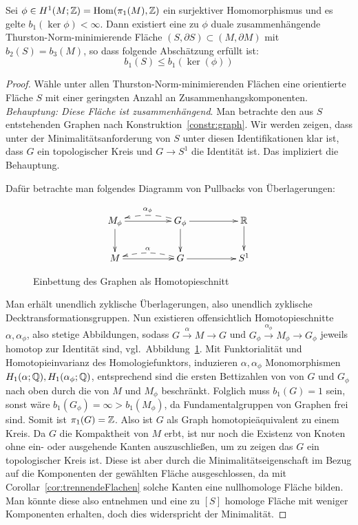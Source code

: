 \begin{lem}
	\label{lem:minS}
	Sei $\phi \in H^1(M;\mathbb{Z})= \operatorname{Hom} (\pi_1(M),\mathbb{Z})$ ein surjektiver Homomorphismus und es gelte $b_1(\ker\phi)<\infty$. Dann existiert eine zu $\phi$ duale zusammenhängende Thurston-Norm-minimierende Fläche $(S,\partial S) \subset (M,\partial M)$ mit $b_2(S)=b_3(M)$, so dass folgende Abschätzung erfüllt ist:
	\[
	b_1(S) \leq b_1(\ker(\phi))
	\]
\end{lem}
\begin{proof}
	Wähle unter allen Thurston-Norm-minimierenden Flächen eine orientierte Fläche $S$ mit einer geringsten Anzahl an Zusammenhangskomponenten.\\
	\textit{Behauptung: Diese Fläche ist zusammenhängend}.
	Man betrachte den aus $S$ entstehenden Graphen nach Konstruktion~\ref{constr:graph}.
	Wir werden zeigen, dass unter der Minimalitätsanforderung von $S$ unter diesen Identifikationen klar ist, dass $G$ ein topologischer Kreis und $G\to S^1$ die Identität ist. Das impliziert die Behauptung.

	Dafür betrachte man folgendes Diagramm von Pullbacks von Überlagerungen:

	\[
	 	\begin{xy}
	 		\xymatrixcolsep{4pc}\xymatrix{
	 			M_\phi \ar[r] \ar[d] & G_\phi \ar[d] \ar@{-->}@/_/[l]_{\alpha_\phi} \ar[r] & \RR \ar[d]\\
	 			M \ar[r] & G \ar@{-->}@/_/[l]_\alpha \ar[r] &S^1
	 		}
	 	\end{xy}
	 \] 
	 \begin{figure}
	 \centering
	 	
	 	\caption{Einbettung des Graphen als Homotopieschnitt}
	 	\label{fig:homotopysection}
	 \end{figure}
	 Man erhält unendlich zyklische Überlagerungen, also unendlich zyklische Decktransformationsgruppen. Nun existieren offensichtlich Homotopieschnitte $\alpha, \alpha_\phi$, also stetige Abbildungen, sodass $ G \stackrel \alpha \to M \to G$ und $ G_\phi \stackrel {\alpha_ \phi} \to M_\phi \to G_\phi$ jeweils homotop zur Identität sind, vgl.\ Abbildung~\ref{fig:homotopysection}. Mit Funktorialität und Homotopieinvarianz des Homologiefunktors, induzieren $\alpha,\alpha_\phi$ Monomorphismen $H_1(\alpha;\mathbb{Q}),H_1(\alpha_\phi;\mathbb{Q})$, entsprechend sind die ersten Bettizahlen von von $G$ und $G_\phi$ nach oben durch die von $M$ und $M_\phi$ beschränkt. Folglich muss $b_1(G)=1$ sein, sonst wäre $b_1(G_\phi)=\infty> b_1(M_\phi)$, da Fundamentalgruppen von Graphen frei sind. Somit ist $\pi_1(G)= \mathbb{Z}$. Also ist $G$ als Graph homotopieäquivalent zu einem Kreis. Da $G$ die Kompaktheit von $M$ erbt, ist nur noch die Existenz von Knoten ohne ein- oder ausgehende Kanten auszuschließen, um zu zeigen das $G$ ein topologischer Kreis ist. Diese ist aber durch die Minimalitätseigenschaft im Bezug auf die Komponenten der gewählten Fläche ausgeschlossen, da mit Corollar~\ref{cor:trennendeFlachen} solche Kanten eine nullhomologe Fläche bilden. Man könnte diese also entnehmen und eine zu $[S]$ homologe Fläche mit weniger Komponenten erhalten, doch dies widerspricht der Minimalität.


\end{proof}
